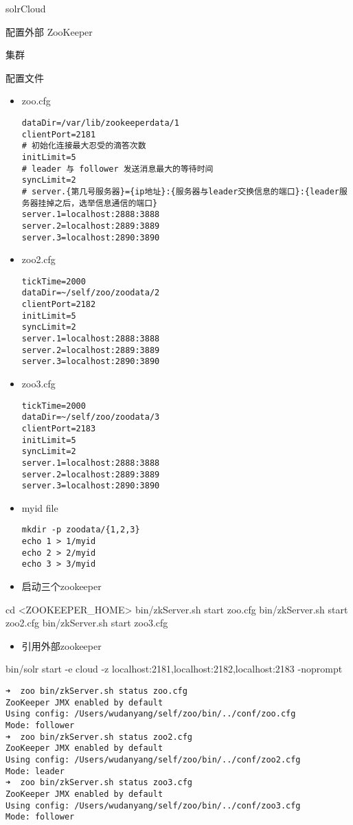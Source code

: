 \documentclass[presentation]{beamer}
\begin{document}
\begin{frame}[fragile,label={sec:org80f600b}]{solrCloud}
\begin{block}{配置外部 ZooKeeper}
\begin{block}{集群}
\begin{block}{配置文件}
\begin{itemize}
\item zoo.cfg
\begin{verbatim}
dataDir=/var/lib/zookeeperdata/1
clientPort=2181
# 初始化连接最大忍受的滴答次数
initLimit=5
# leader 与 follower 发送消息最大的等待时间
syncLimit=2
# server.{第几号服务器}={ip地址}:{服务器与leader交换信息的端口}:{leader服务器挂掉之后，选举信息通信的端口}
server.1=localhost:2888:3888
server.2=localhost:2889:3889
server.3=localhost:2890:3890
\end{verbatim}

\item zoo2.cfg
\begin{verbatim}
tickTime=2000
dataDir=~/self/zoo/zoodata/2
clientPort=2182
initLimit=5
syncLimit=2
server.1=localhost:2888:3888
server.2=localhost:2889:3889
server.3=localhost:2890:3890
\end{verbatim}

\item zoo3.cfg
\begin{verbatim}
tickTime=2000
dataDir=~/self/zoo/zoodata/3
clientPort=2183
initLimit=5
syncLimit=2
server.1=localhost:2888:3888
server.2=localhost:2889:3889
server.3=localhost:2890:3890
\end{verbatim}

\item myid file
\begin{verbatim}
mkdir -p zoodata/{1,2,3}
echo 1 > 1/myid
echo 2 > 2/myid
echo 3 > 3/myid
\end{verbatim}

\item 启动三个zookeeper
\end{itemize}
cd <ZOOKEEPER\_HOME>
bin/zkServer.sh start zoo.cfg
bin/zkServer.sh start zoo2.cfg
bin/zkServer.sh start zoo3.cfg
\begin{itemize}
\item 引用外部zookeeper
\end{itemize}
bin/solr start -e cloud -z localhost:2181,localhost:2182,localhost:2183 -noprompt
\begin{verbatim}
➜  zoo bin/zkServer.sh status zoo.cfg
ZooKeeper JMX enabled by default
Using config: /Users/wudanyang/self/zoo/bin/../conf/zoo.cfg
Mode: follower
➜  zoo bin/zkServer.sh status zoo2.cfg
ZooKeeper JMX enabled by default
Using config: /Users/wudanyang/self/zoo/bin/../conf/zoo2.cfg
Mode: leader
➜  zoo bin/zkServer.sh status zoo3.cfg
ZooKeeper JMX enabled by default
Using config: /Users/wudanyang/self/zoo/bin/../conf/zoo3.cfg
Mode: follower
\end{verbatim}
\end{block}
\end{block}




\end{block}
\end{frame}
\end{document}
